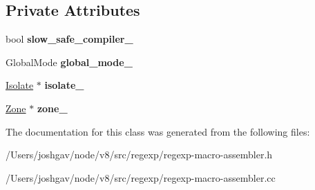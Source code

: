 \subsection*{Private Attributes}
\begin{DoxyCompactItemize}
\item 
bool {\bfseries slow\+\_\+safe\+\_\+compiler\+\_\+}\hypertarget{classv8_1_1internal_1_1_reg_exp_macro_assembler_a2357efbc563c1deeb1ab7f1fb7494a3d}{}\label{classv8_1_1internal_1_1_reg_exp_macro_assembler_a2357efbc563c1deeb1ab7f1fb7494a3d}

\item 
Global\+Mode {\bfseries global\+\_\+mode\+\_\+}\hypertarget{classv8_1_1internal_1_1_reg_exp_macro_assembler_a7cef49db1b38e1f892e49626e4415a42}{}\label{classv8_1_1internal_1_1_reg_exp_macro_assembler_a7cef49db1b38e1f892e49626e4415a42}

\item 
\hyperlink{classv8_1_1internal_1_1_isolate}{Isolate} $\ast$ {\bfseries isolate\+\_\+}\hypertarget{classv8_1_1internal_1_1_reg_exp_macro_assembler_a3fe359ddfdd9cf6a3c1f57a6502ec6c7}{}\label{classv8_1_1internal_1_1_reg_exp_macro_assembler_a3fe359ddfdd9cf6a3c1f57a6502ec6c7}

\item 
\hyperlink{classv8_1_1internal_1_1_zone}{Zone} $\ast$ {\bfseries zone\+\_\+}\hypertarget{classv8_1_1internal_1_1_reg_exp_macro_assembler_a81e97e7085f2d48b2f5147557834a974}{}\label{classv8_1_1internal_1_1_reg_exp_macro_assembler_a81e97e7085f2d48b2f5147557834a974}

\end{DoxyCompactItemize}


The documentation for this class was generated from the following files\+:\begin{DoxyCompactItemize}
\item 
/\+Users/joshgav/node/v8/src/regexp/regexp-\/macro-\/assembler.\+h\item 
/\+Users/joshgav/node/v8/src/regexp/regexp-\/macro-\/assembler.\+cc\end{DoxyCompactItemize}
